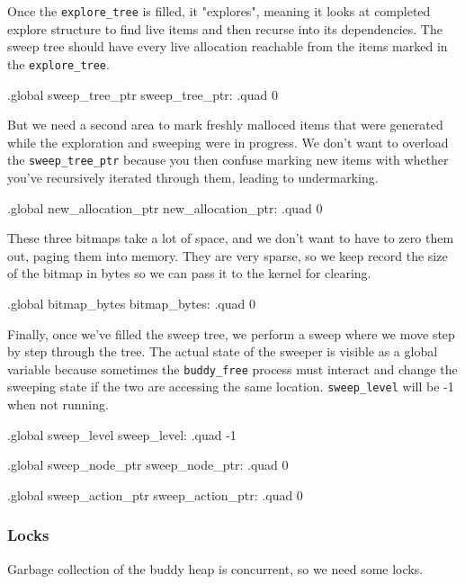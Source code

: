 Once the \lstinline|explore_tree| is filled, it "explores", meaning it looks at
completed explore structure to find live items and then recurse into its
dependencies. The sweep tree should have every live allocation reachable from
the items marked in the \lstinline|explore_tree|.

\begin{asmdata}
.global sweep_tree_ptr
sweep_tree_ptr: .quad 0
\end{asmdata}

But we need a second area to mark freshly malloced items that were
generated while the exploration and sweeping were in progress. We don't
want to overload the \lstinline|sweep_tree_ptr| because you then confuse marking
new items with whether you've recursively iterated through them, leading
to undermarking.

\begin{asmdata}
.global new_allocation_ptr
new_allocation_ptr: .quad 0
\end{asmdata}

These three bitmaps take a lot of space, and we don't want to have to zero them
out, paging them into memory. They are very sparse, so we keep record the size
of the bitmap in bytes so we can pass it to the kernel for clearing.

\begin{asmdata}
.global bitmap_bytes
bitmap_bytes: .quad 0
\end{asmdata}

Finally, once we've filled the sweep tree, we perform a sweep where we move
step by step through the tree. The actual state of the sweeper is visible as a
global variable because sometimes the \lstinline|buddy_free| process must
interact and change the sweeping state if the two are accessing the same
location. \lstinline|sweep_level| will be -1 when not running.

\begin{asmdata}
.global sweep_level
sweep_level: .quad -1

.global sweep_node_ptr
sweep_node_ptr: .quad 0

.global sweep_action_ptr
sweep_action_ptr: .quad 0
\end{asmdata}

\subsubsection{Locks}

Garbage collection of the buddy heap is concurrent, so we need some
locks.

